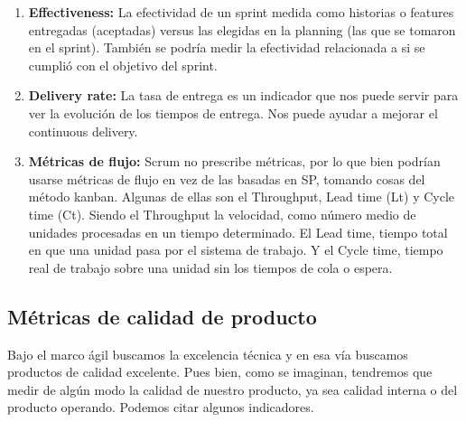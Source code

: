 \begin{enumerate}
\item {\textbf{Effectiveness:} La efectividad de un sprint medida como historias o features entregadas (aceptadas) versus las elegidas en la planning (las que se tomaron en el sprint). También se podría medir la efectividad relacionada a si se cumplió con el objetivo del sprint.
}


\item {\textbf{Delivery rate:} La tasa de entrega es un indicador que nos puede servir para ver la evolución de los tiempos de entrega. Nos puede ayudar a mejorar el continuous delivery.
}

\item {\textbf{Métricas de flujo:} Scrum no prescribe métricas, por lo que bien podrían usarse métricas de flujo en vez de las basadas en SP, tomando cosas del método kanban. Algunas de ellas son el Throughput, Lead time (Lt) y Cycle time (Ct). Siendo el Throughput la velocidad, como número medio de unidades procesadas en un tiempo determinado. El Lead time, tiempo total en que una unidad pasa por el sistema de trabajo. Y el Cycle time, tiempo real de trabajo sobre una unidad sin los tiempos de cola o espera.
}

\end{enumerate}

\subsection{Métricas de calidad de producto}

Bajo el marco ágil buscamos la excelencia técnica y en esa vía buscamos productos de calidad excelente. Pues bien, como se imaginan, tendremos que medir de algún modo la calidad de nuestro producto, ya sea calidad interna o del producto operando. Podemos citar algunos indicadores.

